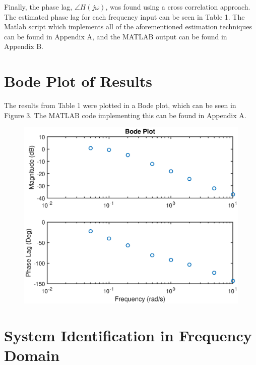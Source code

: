 \documentclass{article}
\begin{document}
Finally, the phase lag, $\angle H(j\omega)$, was found using a cross correlation approach. The estimated phase lag for each frequency input can be seen in Table 1. The Matlab script which implements all of the aforementioned estimation techniques can be found in Appendix A, and the MATLAB output can be found in Appendix B. 




\section{Bode Plot of Results}

The results from Table 1 were plotted in a Bode plot, which can be seen in Figure 3. The MATLAB code implementing this can be found in Appendix A.

\begin{figure}[H]
	\centering
	\includegraphics[scale=0.7]{fig2.eps}
\end{figure}


\section{System Identification in Frequency Domain}
\end{document}
